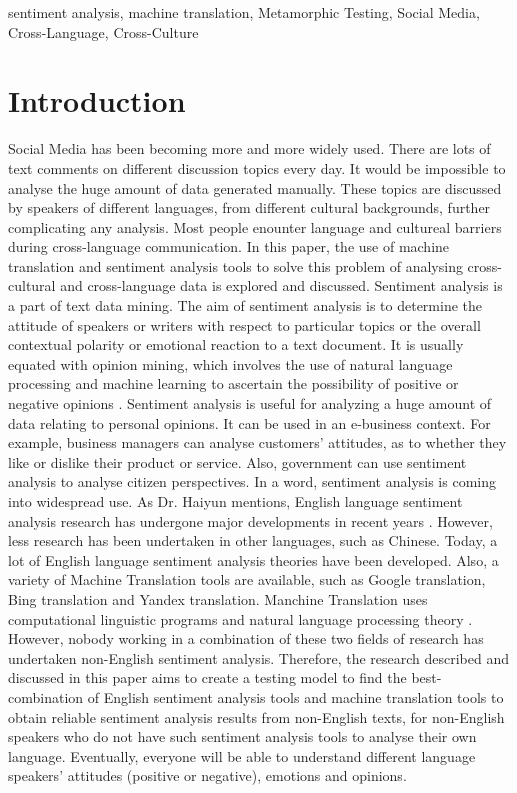 \documentclass[conference]{IEEEtran}
\begin{document}
\begin{IEEEkeywords}
sentiment analysis, machine translation, Metamorphic Testing, Social Media,
Cross-Language, Cross-Culture
\end{IEEEkeywords}

\section{Introduction}

Social Media has been becoming more and more widely used. There are lots of text comments
on different discussion topics every day.
It would be impossible to analyse the huge amount of data generated manually.
These topics are discussed by speakers of different languages, from different
cultural backgrounds, further complicating any analysis.
Most people enounter language and cultureal barriers during cross-language
communication.
In this paper, the use of machine translation and sentiment analysis tools to
solve this problem of analysing cross-cultural and cross-language data is
explored and discussed.
Sentiment analysis is a part of text data mining. The aim of sentiment analysis
is to determine the attitude of speakers or writers with respect to particular topics
or the overall contextual polarity or emotional reaction to a text document. It is usually equated with
opinion mining, which involves the use of natural language processing and
machine learning to ascertain the possibility of positive or negative opinions \cite{sentimentAnalysis}.
Sentiment analysis is useful for analyzing a huge amount of data relating to personal
opinions. It can be used in an e-business context. For example, business managers can analyse
customers' attitudes, as to whether they like or dislike their product or service.
Also, government can use sentiment analysis to analyse citizen perspectives.
In a word, sentiment analysis is coming into widespread use.
As Dr. Haiyun mentions, English language sentiment analysis research has
undergone major developments in recent years \cite{ChineseSentimentAnalysis}.
However, less research has been undertaken in other languages, such as Chinese.
Today, a lot of English language sentiment analysis theories have been
developed. Also, a variety of Machine Translation tools are available, such as Google
translation, Bing translation and Yandex translation.
Manchine Translation uses computational linguistic programs and natural language
processing theory \cite{machineTranslation}.
However, nobody working in a combination of these two fields of research has undertaken non-English
sentiment analysis. Therefore, the research described and discussed in this paper aims to create a testing model to find the best-combination of English
sentiment analysis tools and machine translation tools to obtain reliable
sentiment analysis results from non-English texts, for non-English speakers who
do not have such sentiment analysis tools to analyse their own language.
Eventually, everyone will be able to understand different language speakers'
attitudes (positive or negative), emotions and opinions.\\
\end{document}
